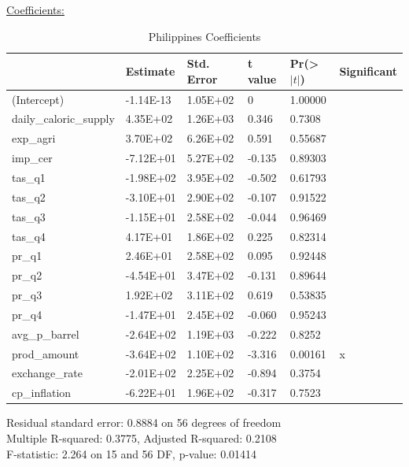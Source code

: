 \documentclass[11pt]{article}
\begin{document}
\underline{Coefficients:}
\FloatBarrier
\begin{table}[!htbp]
\centering
\begin{tabular}{llllll}
\hline
                       & Estimate  & Std. Error & t value & Pr(\textgreater$|t|$) & Significant \\ \hline
(Intercept)            & -1.14E-13 & 1.05E+02   & 0       & 1.00000             &             \\
daily\_caloric\_supply & 4.35E+02  & 1.26E+03   & 0.346   & 0.7308              &             \\
exp\_agri              & 3.70E+02  & 6.26E+02   & 0.591   & 0.55687             &             \\
imp\_cer               & -7.12E+01 & 5.27E+02   & -0.135  & 0.89303             &             \\
tas\_q1                & -1.98E+02 & 3.95E+02   & -0.502  & 0.61793             &             \\
tas\_q2                & -3.10E+01 & 2.90E+02   & -0.107  & 0.91522             &             \\
tas\_q3                & -1.15E+01 & 2.58E+02   & -0.044  & 0.96469             &             \\
tas\_q4                & 4.17E+01  & 1.86E+02   & 0.225   & 0.82314             &             \\
pr\_q1                 & 2.46E+01  & 2.58E+02   & 0.095   & 0.92448             &             \\
pr\_q2                 & -4.54E+01 & 3.47E+02   & -0.131  & 0.89644             &             \\
pr\_q3                 & 1.92E+02  & 3.11E+02   & 0.619   & 0.53835             &             \\
pr\_q4                 & -1.47E+01 & 2.45E+02   & -0.060  & 0.95243             &             \\
avg\_p\_barrel         & -2.64E+02 & 1.19E+03   & -0.222  & 0.8252              &             \\
prod\_amount           & -3.64E+02 & 1.10E+02   & -3.316  & 0.00161             & x           \\
exchange\_rate         & -2.01E+02 & 2.25E+02   & -0.894  & 0.3754              &             \\
cp\_inflation          & -6.22E+01 & 1.96E+02   & -0.317  & 0.7523              &            \\ \hline
\end{tabular}
\caption{Philippines Coefficients}
\label{table18}
\end{table}
\FloatBarrier
Residual standard error: 0.8884 on 56 degrees of freedom \\
Multiple R-squared:  0.3775,	Adjusted R-squared:  0.2108 \\ 
F-statistic: 2.264 on 15 and 56 DF,  p-value: 0.01414
\end{document}
